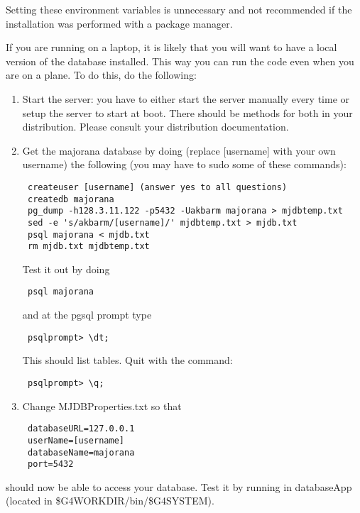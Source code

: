 Setting these environment variables is unnecessary and not recommended
if the installation was performed with a package manager.

If you are running on a laptop, it is likely that you will want to
have a local version of the database installed. This way you can run
the code even when you are on a plane. To do this, do the following:
 
\begin{enumerate}

\item{} Start the server: you have to either start the server manually
  every time or setup the server to start at boot.  There should be
  methods for both in your distribution.  Please consult your
  distribution documentation.

\item{} Get the majorana database by doing (replace [username] with
  your own username) the following (you may have to sudo some of these
  commands):

 
\begin{lstlisting}
 createuser [username] (answer yes to all questions)
 createdb majorana
 pg_dump -h128.3.11.122 -p5432 -Uakbarm majorana > mjdbtemp.txt
 sed -e 's/akbarm/[username]/' mjdbtemp.txt > mjdb.txt
 psql majorana < mjdb.txt
 rm mjdb.txt mjdbtemp.txt
 \end{lstlisting}
  Test it out by doing 
\begin{lstlisting}
 psql majorana
\end{lstlisting}
and at the pgsql prompt type
\begin{lstlisting}
 psqlprompt> \dt; 
\end{lstlisting}
 This should list tables.  Quit with the command:
\begin{lstlisting}
 psqlprompt> \q; 
\end{lstlisting}


\item{}  Change MJDBProperties.txt so that 
 
\begin{lstlisting}
 databaseURL=127.0.0.1
 userName=[username]
 databaseName=majorana
 port=5432
 \end{lstlisting}
  

\end{enumerate}

\mage should now be able to access your database. Test it by running in
databaseApp (located in \$G4WORKDIR/bin/\$G4SYSTEM).
 
 

